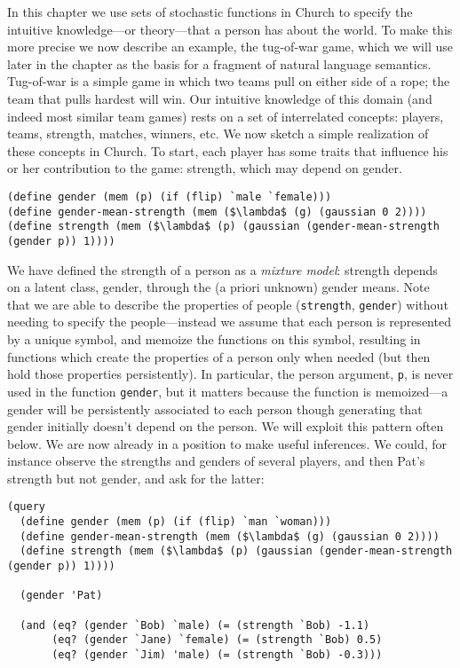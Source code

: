 \documentclass[12pt]{article}
\begin{document}
In this chapter we use sets of stochastic functions in Church to specify the intuitive knowledge---or theory---that a person has about the world. To make this more precise we now describe an example, the tug-of-war game, which we will use later in the chapter as the basis for a fragment of natural language semantics. Tug-of-war is a simple game in which two teams pull on either side of a rope; the team that pulls hardest will win. Our intuitive knowledge of this domain (and indeed most similar team games) rests on a set of interrelated concepts: players, teams, strength, matches, winners, etc. We now sketch a simple realization of these concepts in Church. To start, each player has some traits that influence his or her contribution to the game: strength, which may depend on gender.
\begin{lstlisting}[mathescape]
(define gender (mem (p) (if (flip) `male `female)))
(define gender-mean-strength (mem ($\lambda$ (g) (gaussian 0 2))))
(define strength (mem ($\lambda$ (p) (gaussian (gender-mean-strength (gender p)) 1))))
\end{lstlisting}
We have defined the strength of a person as a \emph{mixture model}: strength depends on a latent class, gender, through the (a priori unknown) gender means. Note that we are able to describe the properties of people (\lstinline{strength}, \lstinline{gender}) without needing to specify the people---instead we assume that each person is represented by a unique symbol, and memoize the functions on this symbol, resulting in functions which create the properties of a person only when needed (but then hold those properties persistently). In particular, the person argument, \lstinline{p}, is never used in the function \lstinline{gender}, but it matters because the function is memoized---a gender will be persistently associated to each person though generating that gender initially doesn't depend on the person. We will exploit this pattern often below.
We are now already in a position to make useful inferences. We could, for instance observe the strengths and genders of several players, and then Pat's strength but not gender, and ask for the latter:
\begin{lstlisting}[mathescape]
(query
  (define gender (mem (p) (if (flip) `man `woman)))
  (define gender-mean-strength (mem ($\lambda$ (g) (gaussian 0 2))))
  (define strength (mem ($\lambda$ (p) (gaussian (gender-mean-strength (gender p)) 1))))
  
  (gender 'Pat)
  
  (and (eq? (gender `Bob) `male) (= (strength `Bob) -1.1)
       (eq? (gender `Jane) `female) (= (strength `Bob) 0.5)
       (eq? (gender `Jim) 'male) (= (strength `Bob) -0.3)))
\end{lstlisting}
\end{document}
